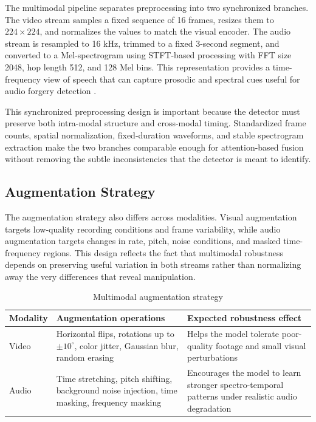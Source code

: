 The multimodal pipeline separates preprocessing into two synchronized branches. The video stream samples a fixed sequence of 16 frames, resizes them to $224 \times 224$, and normalizes the values to match the visual encoder. The audio stream is resampled to 16 kHz, trimmed to a fixed 3-second segment, and converted to a Mel-spectrogram using STFT-based processing with FFT size 2048, hop length 512, and 128 Mel bins. This representation provides a time-frequency view of speech that can capture prosodic and spectral cues useful for audio forgery detection \cite{Tak2023Audio}.

This synchronized preprocessing design is important because the detector must preserve both intra-modal structure and cross-modal timing. Standardized frame counts, spatial normalization, fixed-duration waveforms, and stable spectrogram extraction make the two branches comparable enough for attention-based fusion without removing the subtle inconsistencies that the detector is meant to identify.

\subsection{Augmentation Strategy}

The augmentation strategy also differs across modalities. Visual augmentation targets low-quality recording conditions and frame variability, while audio augmentation targets changes in rate, pitch, noise conditions, and masked time-frequency regions. This design reflects the fact that multimodal robustness depends on preserving useful variation in both streams rather than normalizing away the very differences that reveal manipulation.

\begin{table}[H]
\centering
\small
\caption{Multimodal augmentation strategy}
\label{tab:multimodal-augmentation}
\begin{tabular}{p{}p{}p{}}
\toprule
\textbf{Modality} & \textbf{Augmentation operations} & \textbf{Expected robustness effect} \\
\midrule
Video & Horizontal flips, rotations up to $\pm 10^{\circ}$, color jitter, Gaussian blur, random erasing & Helps the model tolerate poor-quality footage and small visual perturbations \\
Audio & Time stretching, pitch shifting, background noise injection, time masking, frequency masking & Encourages the model to learn stronger spectro-temporal patterns under realistic audio degradation \\
\bottomrule
\end{tabular}
\end{table}

